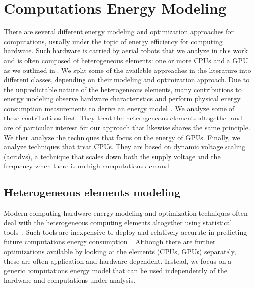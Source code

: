 \section{Computations Energy Modeling}
\label{sec:soa-ene-mod}

There are several different energy modeling and optimization approaches for computations, usually under the topic of energy efficiency for computing hardware. 
Such hardware is carried by aerial robots that we analyze in this work and is often composed of heterogeneous elements: one or more CPUs and a GPU as we outlined in . We split some of the available approaches in the literature into different classes, depending on their modeling and optimization approach. Due to the unpredictable nature of the heterogeneous elements, many contributions to energy modeling observe hardware characteristics and perform physical energy consumption measurements to derive an energy model~\citep{teamplay}. We analyze some of these contributions first. They treat the heterogeneous elements altogether and are of particular interest for our approach that likewise shares the same principle. We then analyze the techniques that focus on the energy of GPUs. Finally, we analyze techniques that treat CPUs. They are based on dynamic voltage scaling (\Gls{acr:dvs}), a technique that scales down both the supply voltage and the frequency when there is no high computations demand~\citep{flautner2001automatic, chen2009fundamentals}.

\subsection{Heterogeneous elements modeling}

Modern computing hardware energy modeling and optimization techniques often deal with the heterogeneous computing elements altogether using statistical tools~\citep{teamplay}. Such tools are inexpensive to deploy and relatively accurate in predicting future computations energy consumption~\citep{seewald2019coarse}. Although there are further optimizations available by looking at the elements (CPUs, GPUs) separately, these are often application and hardware-dependent. Instead, we focus on a generic computations energy model that can be used independently of the hardware and computations under analysis. 

